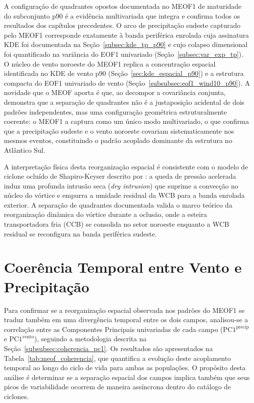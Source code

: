 A configuração de quadrantes opostos documentada no MEOF1 de maturidade do subconjunto p90 é a evidência multivariada que integra e confirma todos os resultados dos capítulos precedentes. 
O arco de precipitação sudeste capturado pelo MEOF1 corresponde exatamente à banda periférica enrolada cuja assinatura KDE foi documentada na Seção~\ref{subsec:kde_tp_p90} e cujo colapso dimensional foi quantificado na variância do EOF1 univariado (Seção~\ref{subsec:var_exp_tp}).
O núcleo de vento noroeste do MEOF1 replica a concentração espacial identificada no KDE de vento p90 (Seção~\ref{sec:kde_espacial_p90}) e a estrutura compacta do EOF1 univariado de vento (Seção~\ref{subsubsec:eof1_wind10_p90}). A novidade que o MEOF aporta é que, ao decompor a covariância conjunta, demonstra que a separação de quadrantes não é a justaposição acidental de dois padrões independentes, mas uma configuração geométrica estruturalmente coerente: o MEOF1 a captura como um único modo multivariado, o que confirma que a precipitação sudeste e o vento noroeste covariam sistematicamente nos mesmos eventos, constituindo o padrão acoplado dominante da estrutura no Atlântico Sul.

A interpretação física desta reorganização espacial é consistente com o modelo de ciclone ocluído de Shapiro-Keyser descrito por \citet{schultz2021antecedents}: a queda de pressão acelerada induz uma profunda intrusão seca (\textit{dry intrusion}) que suprime a convecção no núcleo do vórtice e empurra a umidade residual da WCB para a banda enrolada exterior. A separação de quadrantes documentada valida o marco teórico da reorganização dinâmica do vórtice durante a oclusão, onde a esteira transportadora fria (CCB) se consolida no setor noroeste enquanto a WCB residual se reconfigura na banda periférica sudeste.

\section{Coerência Temporal entre Vento e Precipitação}
\label{sec:meof_coherencia}

Para confirmar se a reorganização espacial observada nos padrões do MEOF1 se traduz também em uma divergência temporal entre os dois campos, analisou-se a correlação entre as Componentes Principais univariadas de cada campo ($\text{PC1}^{\text{precip}}$ e $\text{PC1}^{\text{vento}}$), seguindo a metodologia descrita na Seção~\ref{subsubsec:coherencia_pc1}. Os resultados são apresentados na Tabela~\ref{tab:meof_coherencia}, que quantifica a evolução deste acoplamento temporal ao longo do ciclo de vida para ambas as populações. O propósito desta análise é determinar se a separação espacial dos campos implica também que seus picos de variabilidade ocorrem de maneira assíncrona dentro do catálogo de ciclones.

